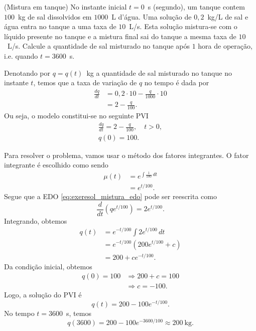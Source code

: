 \begin{exeresol}(Mistura em tanque)\label{exeresol:mistura_em_tanque}
  No instante inicial $t=0$~s (segundo), um tanque contem $100$~kg de sal dissolvidos em $1000$~L d'água. Uma solução de $0,2$~kg/L de sal e água entra no tanque a uma taxa de $10$~L/s. Esta solução mistura-se com o líquido presente no tanque e a mistura final sai do tanque a mesma taxa de $10$~L/s. Calcule a quantidade de sal misturado no tanque após $1$ hora de operação, i.e. quando $t=3600$~s.
\end{exeresol}
\begin{resol}
  Denotando por $q = q(t)$~kg a quantidade de sal misturado no tanque no instante $t$, temos que a taxa de variação de $q$ no tempo é dada por
  \begin{align}
    \frac{dq}{dt} &= 0,2\cdot 10 - \frac{q}{1000}\cdot 10 \\
                  &= 2 - \frac{q}{100}.
  \end{align}
  Ou seja, o modelo constitui-se no seguinte PVI
  \begin{align}
    \frac{dq}{dt} = 2 - \frac{q}{100},\quad t>0,\label{eq:exeresol_mistura_edo}\\
    q(0) = 100.
  \end{align}

  Para resolver o problema, vamos usar o método dos fatores integrantes. O fator integrante é escolhido como sendo
  \begin{align}
    \mu(t) &= e^{\int \frac{1}{100}\,dt} \\
           &= e^{t/100}.
  \end{align}
  Segue que a EDO \eqref{eq:exeresol_mistura_edo} pode ser reescrita como
  \begin{equation}
    \frac{d}{dt}\left(qe^{t/100}\right) = 2e^{t/100}.
  \end{equation}
  Integrando, obtemos
  \begin{align}
    q(t) &= e^{-t/100}\int 2e^{t/100}\,dt \\
         &= e^{-t/100}\left(200e^{t/100} + c\right) \\
         &= 200 + ce^{-t/100}.
  \end{align}
  Da condição inicial, obtemos
  \begin{align}
    q(0) = 100 &\Rightarrow 200 + c = 100 \\
               &\Rightarrow c = -100.
  \end{align}
  Logo, a solução do PVI é
  \begin{equation}
    q(t) = 200 - 100e^{-t/100}.
  \end{equation}
  No tempo $t=3600$~s, temos
  \begin{equation}
    q(3600) = 200 - 100e^{-3600/100} \approx 200~\text{kg}.
  \end{equation}
\end{resol}

